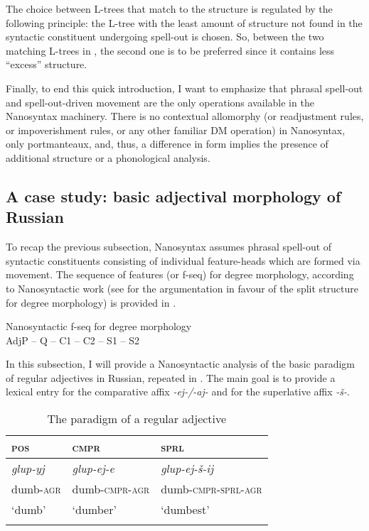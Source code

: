 \documentclass[output=paper,colorlinks,citecolor=brown]{langscibook}
\begin{document}
The choice between L-trees that match to the structure is regulated by the following principle: the L-tree with the least amount of structure not found in the syntactic constituent undergoing spell-out is chosen. So, between the two matching L-trees in , the second one is to be preferred since it contains less ``excess'' structure.

Finally, to end this quick introduction, I want to emphasize that phrasal spell-out and spell-out-driven movement are the only operations available in the Na\-no\-syn\-tax machinery. There is no contextual allomorphy (or readjustment rules, or impoverishment rules, or any other familiar DM operation) in Nanosyntax, only portmanteaux, and, thus, a difference in form implies the presence of additional structure or a phonological analysis.

\subsection{A case study: basic adjectival morphology of Russian}

To recap the previous subsection, Nanosyntax assumes phrasal spell-out of syntactic constituents consisting of individual feature-heads which are formed via movement. The sequence of features (or f-seq) for degree morphology, according to Nanosyntactic work (see \citealt{Caha:2019} for the argumentation in favour of the split structure for degree morphology) is provided in .

\ea Nanosyntactic f-seq for degree morphology\label{kas:ex:f-seq}\\
		AdjP -- Q -- C1 -- C2 -- S1 -- S2
\z

\noindent In this subsection, I will provide a Nanosyntactic analysis of the basic paradigm of regular adjectives in Russian, repeated in . The main goal is to provide a lexical entry for the comparative affix \textit{-ej-/-aj-} and for the superlative affix \textit{-š-}. 

\begin{table}
\caption{The paradigm of a regular adjective}
\label{kas:tab:regular:desideratum}
 \begin{tabularx}{.8\textwidth}{QQl}
  \lsptoprule
        \textsc{pos}   &\textsc{cmpr}  & \textsc{sprl} \\
  \midrule
        \textit{glup-yj} &\textit{glup-ej-e}  &\textit{glup-ej-š-ij} \\
        {dumb-\textsc{agr}} &{dumb-\textsc{cmpr-agr}}    &{dumb-\textsc{cmpr-sprl-agr}}  \\
        {`dumb'} & {`dumber'} & {`dumbest'}\\
  \lspbottomrule
 \end{tabularx}
\end{table}
\end{document}
